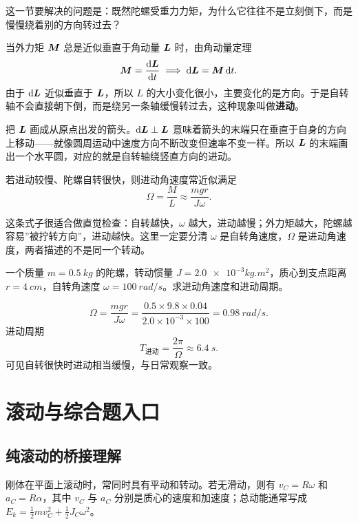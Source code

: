 \documentclass[lang=cn,11pt]{elegantbook}
\newcommand{\bridge}[1]{\begin{note}#1\end{note}}
\begin{document}
这一节要解决的问题是：既然陀螺受重力力矩，为什么它往往不是立刻倒下，而是慢慢绕着别的方向转过去？

当外力矩 \(\vb*{M}\) 总是近似垂直于角动量 \(\vb*{L}\) 时，由角动量定理
\[
\vb*{M}=\dv{\vb*{L}}{t} \implies \dd \vb*{L}=\vb*{M}\,\dd t.
\]
由于 \(\dd \vb*{L}\) 近似垂直于 \(\vb*{L}\)，所以 \(L\) 的大小变化很小，主要变化的是方向。于是自转轴不会直接朝下倒，而是绕另一条轴缓慢转过去，这种现象叫做\textbf{进动}。

\begin{remark}[几何图像]
把 \(\vb*{L}\) 画成从原点出发的箭头。\(\dd\vb*{L}\perp\vb*{L}\) 意味着箭头的末端只在垂直于自身的方向上移动——就像圆周运动中速度方向不断改变但速率不变一样。所以 \(\vb*{L}\) 的末端画出一个水平圆，对应的就是自转轴绕竖直方向的进动。
\end{remark}

若进动较慢、陀螺自转很快，则进动角速度常近似满足
\[
\Omega=\frac{M}{L}\approx \frac{mgr}{J\omega}.
\]

\bridge{这条式子很适合做直觉检查：自转越快，\(\omega\) 越大，进动越慢；外力矩越大，陀螺越容易”被拧转方向”，进动越快。这里一定要分清 \(\omega\) 是自转角速度，\(\Omega\) 是进动角速度，两者描述的不是同一个转动。}

\begin{example}
一个质量 \(m=\SI{0.5}{kg}\) 的陀螺，转动惯量 \(J=\num{2.0e-3}\unit{kg.m^2}\)，质心到支点距离 \(r=\SI{4}{cm}\)，自转角速度 \(\omega=\SI{100}{rad/s}\)。求进动角速度和进动周期。
\end{example}
\begin{solution}
\[
\Omega=\frac{mgr}{J\omega}=\frac{0.5\times9.8\times0.04}{2.0\times10^{-3}\times100}=\SI{0.98}{rad/s}.
\]
进动周期
\[
T_{\text{进动}}=\frac{2\pi}{\Omega}\approx\SI{6.4}{s}.
\]
可见自转很快时进动相当缓慢，与日常观察一致。
\end{solution}

\section{滚动与综合题入口}

\subsection{纯滚动的桥接理解}

刚体在平面上滚动时，常同时具有平动和转动。若无滑动，则有 \(v_C=R\omega\) 和 \(a_C=R\alpha\)，其中 \(v_C\) 与 \(a_C\) 分别是质心的速度和加速度；总动能通常写成 \(E_k=\frac12 mv_C^2+\frac12 J_C\omega^2\)。
\end{document}

